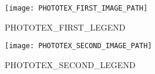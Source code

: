 \begin{minipage}[t][0.025\textheight][t]{\textwidth}
  \hfill\vfill
\end{minipage}
\begin{minipage}[t][0.45\textheight][t]{\textwidth}
  \begin{center}
    \texttt{[image: PHOTOTEX\_FIRST\_IMAGE\_PATH]}\\[1em]
  \end{center}
\end{minipage}
\begin{minipage}[t][0.03\textheight][t]{\textwidth}
  \begin{center}
    PHOTOTEX_FIRST_LEGEND\\[1em]
  \end{center}
\end{minipage}
\begin{minipage}[t][0.45\textheight][t]{\textwidth}
  \begin{center}
    \texttt{[image: PHOTOTEX\_SECOND\_IMAGE\_PATH]}\\[1em]
  \end{center}
\end{minipage}
\begin{minipage}[t][0.03\textheight][t]{\textwidth}
  \begin{center}
    PHOTOTEX_SECOND_LEGEND\\[1em]
  \end{center}
\end{minipage}

\clearpage
